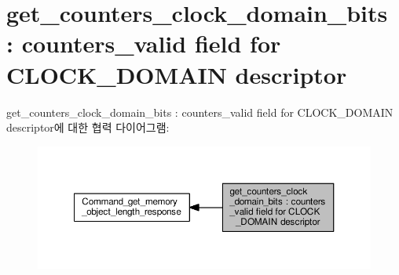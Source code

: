 \hypertarget{group__get__counters__clock__domain__bits}{}\section{get\+\_\+counters\+\_\+clock\+\_\+domain\+\_\+bits \+: counters\+\_\+valid field for C\+L\+O\+C\+K\+\_\+\+D\+O\+M\+A\+IN descriptor}
\label{group__get__counters__clock__domain__bits}
get\+\_\+counters\+\_\+clock\+\_\+domain\+\_\+bits \+: counters\+\_\+valid field for C\+L\+O\+C\+K\+\_\+\+D\+O\+M\+A\+IN descriptor에 대한 협력 다이어그램\+:
\nopagebreak
\begin{figure}[H]
\begin{center}
\leavevmode
\includegraphics[width=350pt]{group__get__counters__clock__domain__bits}
\end{center}
\end{figure}
